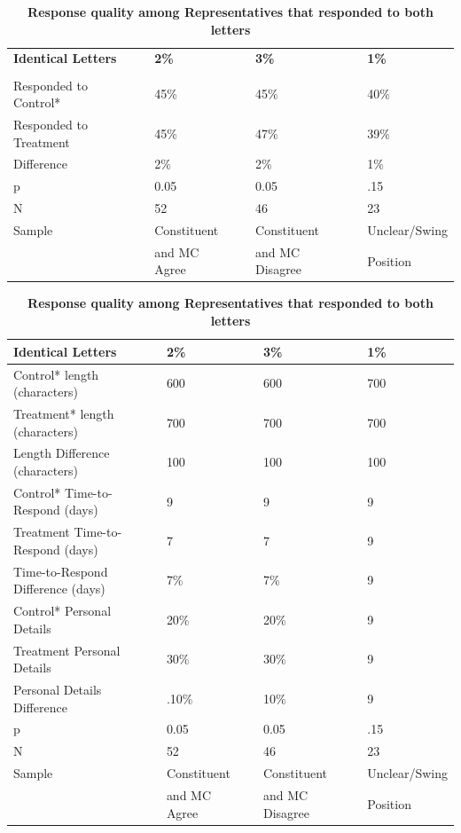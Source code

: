\documentclass[12pt]{article}
\begin{document}
\begin{table}[h!]
	\caption{\textbf{Response quality among Representatives that responded to both letters}}
\label{tab2}
\begin{tabular}{lllllll}
	\textbf{Identical Letters }   && \textbf{2\% }           &&   \textbf{3\%}   && \textbf{1\%} \\\\
	\hline
	Responded to Control*   && 45\%            &&   45\%   && 40\% \\
	Responded to Treatment &&   45\%        &&   47\%    && 39\% \\
	Difference                       && 2\%           &&   2\%   && 1\%    \\
	\hline
	p            && 0.05 				&&   0.05 &&  .15\\
	N 			 &&      52 			 &&  46    &&  23\\ 
	\hline
	Sample && Constituent   && Constituent   &&    Unclear/Swing   \\  
	&&								and MC	Agree	&& and MC Disagree               &&   Position\\ 
\end{tabular}
\end{table}

 \begin{table}[h!]
	\caption{\textbf{Response quality among Representatives that responded to both letters}}
	\label{tab2}
	\begin{tabular}{lllllll}
		\textbf{Identical Letters}   && \textbf{2\% }           &&   \textbf{3\%}   && \textbf{1\%}\\
		\hline
		Control* length (characters)   && 600            &&   600   && 700 \\
		Treatment* length  (characters) && 700            &&   700   && 700\\
		Length Difference  (characters) && 100           &&   100   && 100\\
		\hline
		Control* Time-to-Respond  (days) && 9            &&   9   && 9\\
		Treatment Time-to-Respond (days) && 7         &&   7    &&  9 \\ 
		Time-to-Respond Difference (days) && 7\%            &&   7\%   &&  9 \\ 
		\hline
		Control* Personal Details                && 20\%            &&   20\%   &&  9\\
		Treatment Personal Details                && 30\%            &&   30\%   &&  9 \\
		Personal Details Difference && .10\%                      &&  10\%   &&  9 \\
		\hline
		p            && 0.05 				&&   0.05 &&  .15\\
		N 			 &&      52 			 &&  46    &&  23\\ 
		\hline
		Sample && Constituent   && Constituent   &&    Unclear/Swing   \\  
		&&								and MC	Agree	&& and MC Disagree               &&   Position\\ 
	\end{tabular}
\end{table}
\end{document}
